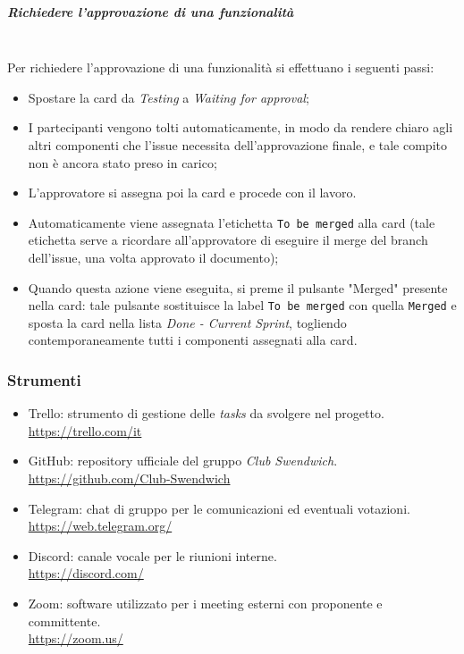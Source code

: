 \subparagraph{Richiedere l'approvazione di una funzionalità}
\mbox{}\\
Per richiedere l'approvazione di una funzionalità si effettuano i seguenti passi:
\begin{itemize} 
    \item Spostare la card da \textit{Testing} a \textit{Waiting for approval};
    \item I partecipanti vengono tolti automaticamente, in modo da rendere chiaro agli altri componenti che l'issue necessita dell'approvazione finale, e tale compito non è ancora stato preso in carico;
    \item L'approvatore si assegna poi la card e procede con il lavoro.
    \item Automaticamente viene assegnata l'etichetta \texttt{To be merged} alla card (tale etichetta serve a ricordare all'approvatore di eseguire il merge del branch dell'issue, una volta approvato il documento);
    \item Quando questa azione viene eseguita, si preme il pulsante "Merged" presente nella card: tale pulsante sostituisce la label \texttt{To be merged} con quella \texttt{Merged} e sposta la card nella lista \textit{Done - Current Sprint}, togliendo contemporaneamente tutti i componenti assegnati alla card.
\end{itemize}

\subsubsection{Strumenti}

\begin{itemize}
    \item Trello: strumento di gestione delle \textit{tasks} da svolgere nel progetto. \\
    \href{https://trello.com/it}{https://trello.com/it}
    \item GitHub: repository ufficiale del gruppo \textit{Club Swendwich}.\\
    \href{https://github.com/Club-Swendwich}{https://github.com/Club-Swendwich}
    \item Telegram: chat di gruppo per le comunicazioni ed eventuali votazioni. \\
    \href{https://web.telegram.org/}{https://web.telegram.org/}
    \item Discord: canale vocale per le riunioni interne.\\
    \href{https://discord.com/}{https://discord.com/}
    \item Zoom: software utilizzato per i meeting esterni con proponente e committente.\\
    \href{https://zoom.us/}{https://zoom.us/}
\end{itemize}